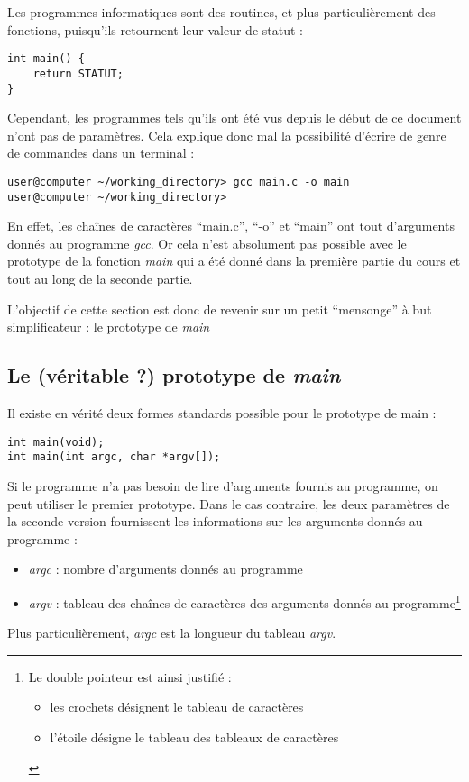\documentclass[../../../main.tex]{subfiles}
\begin{document}
Les programmes informatiques sont des routines, et plus particulièrement des fonctions, puisqu'ils retournent leur valeur de statut :
\begin{verbatim}
int main() {
	return STATUT;
}
\end{verbatim}
Cependant, les programmes tels qu'ils ont été vus depuis le début de ce document n'ont pas de paramètres. Cela explique donc mal la possibilité d'écrire de genre de commandes dans un terminal :
\begin{verbatim}
user@computer ~/working_directory> gcc main.c -o main
user@computer ~/working_directory>
\end{verbatim}
En effet, les chaînes de caractères ``main.c'', ``-o'' et ``main'' ont tout d'arguments donnés au programme \textit{gcc}. Or cela n'est absolument pas possible avec le prototype de la fonction \textit{main} qui a été donné dans la première partie du cours et tout au long de la seconde partie.

L'objectif de cette section est donc de revenir sur un petit ``mensonge'' à but simplificateur : le prototype de \textit{main}
\subsection{Le (véritable ?) prototype de \textit{main}}
Il existe en vérité deux formes standards possible pour le prototype de \textsf{main} :
\begin{verbatim}
int main(void);
int main(int argc, char *argv[]);
\end{verbatim}
Si le programme n'a pas besoin de lire d'arguments fournis au programme, on peut utiliser le premier prototype. Dans le cas contraire, les deux paramètres de la seconde version fournissent les informations sur les arguments donnés au programme :
\begin{itemize}
	\item \textit{argc} : nombre d'arguments donnés au programme
	\item \textit{argv} : tableau des chaînes de caractères des arguments donnés au programme\footnote{Le double pointeur est ainsi justifié : \begin{itemize}
	\item les crochets désignent le tableau de caractères
	\item l'étoile désigne le tableau des tableaux de caractères
	\end{itemize}}
\end{itemize}
Plus particulièrement, \textit{argc} est la longueur du tableau \textit{argv}.
\end{document}
